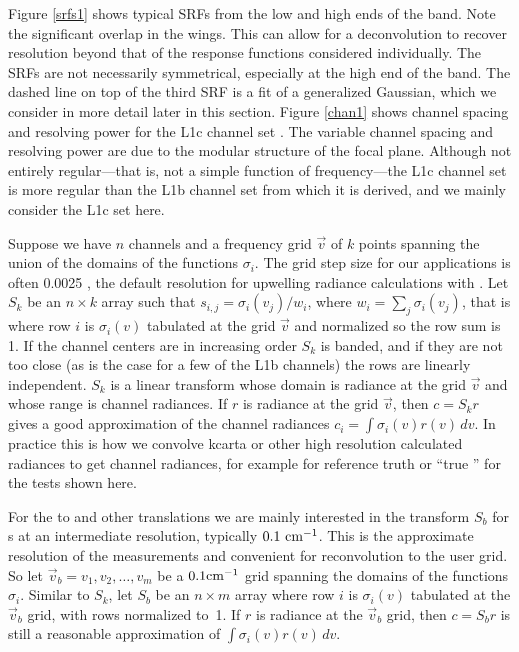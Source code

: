 \documentclass[11pt]{article}
\begin{document}
Figure \ref{srfs1} shows typical {\airs} SRFs from the low and high
ends of the band.  Note the significant overlap in the wings.  This
can allow for a deconvolution to recover resolution beyond that of
the response functions considered individually.  The SRFs are not
necessarily symmetrical, especially at the high end of the band.
The dashed line on top of the third SRF is a fit of a generalized
Gaussian, which we consider in more detail later in this section.
Figure \ref{chan1} shows channel spacing and resolving power for the
{\airs} L1c channel set \cite{airs1c}.  The variable channel spacing
and resolving power are due to the modular structure of the focal
plane.  Although not entirely regular---that is, not a simple
function of frequency---the L1c channel set is more regular than the
L1b channel set from which it is derived, and we mainly consider the
L1c set here.

Suppose we have $n$ channels and a frequency grid $\vec v$ of 
$k$ points spanning the union of the domains of the functions
$\sigma_i$.  The grid step size for our applications is often 0.0025
{\wn}, the default resolution for upwelling radiance calculations
with \cite{kcarta1}.  Let $S_k$ be an $n\times k$ array such that
$s_{i,j} = \sigma_i(v_j)/w_i$, where $w_i = \sum_j \sigma_i(v_j)$,
that is where row $i$ is $\sigma_i(v)$ tabulated at the grid $\vec
v$ and normalized so the row sum is 1.  If the channel centers are
in increasing order $S_k$ is banded, and if they are not too close
(as is the case for a few of the L1b channels) the rows are linearly
independent.  $S_k$ is a linear transform whose domain is radiance
at the grid $\vec v$ and whose range is channel radiances.  If $r$
is radiance at the grid $\vec v$, then $c = S_k r$ gives a good
approximation of the channel radiances $c_i =
\int\sigma_i(v)r(v)\,dv$.  In practice this is how we convolve
kcarta or other high resolution calculated radiances to get {\airs}
channel radiances, for example for reference truth or ``true
{\airs}'' for the tests shown here.


For the {\airs} to {\cris} and other translations we are mainly
interested in the transform $S_b$ for {\srf}s at an intermediate
resolution, typically $0.1~\mbox{cm$^{-1}$}$.  This is the approximate resolution
of the {\srf} measurements and convenient for reconvolution to the
{\cris} user grid.  So let $\vec v_b = v_1,v_2,\ldots,v_m$ be a $0.1
\mbox{cm$^{-1}$}$ grid spanning the domains of the functions $\sigma_i$.  Similar
to $S_k$, let $S_b$ be an $n\times m$ array where row $i$ is
$\sigma_i(v)$ tabulated at the $\vec v_b$ grid, with rows normalized
to~1.  If $r$ is radiance at the $\vec v_b$ grid, then $c = S_b r$
is still a reasonable approximation of $\int\sigma_i(v)r(v)\,dv$.
\end{document}
